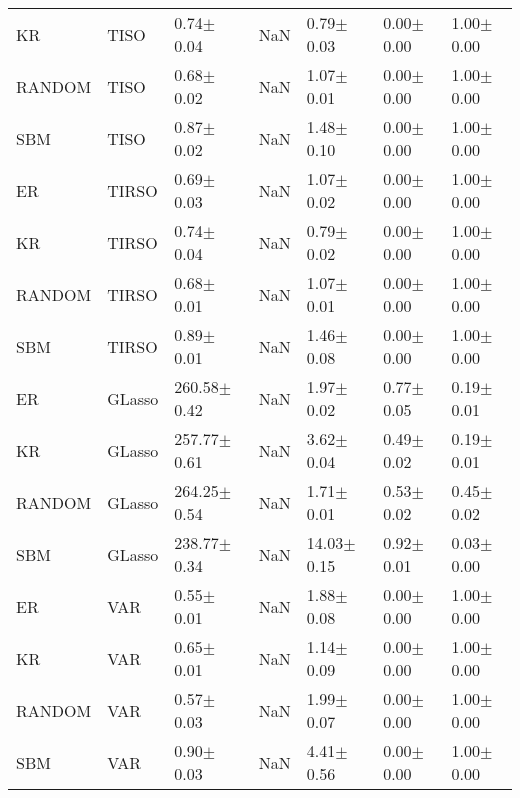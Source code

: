 \begin{tabular}{lllllll}
KR & TISO & 0.74{\scriptsize$\pm$0.04} & NaN & 0.79{\scriptsize$\pm$0.03} & 0.00{\scriptsize$\pm$0.00} & 1.00{\scriptsize$\pm$0.00} \\
RANDOM & TISO & 0.68{\scriptsize$\pm$0.02} & NaN & 1.07{\scriptsize$\pm$0.01} & 0.00{\scriptsize$\pm$0.00} & 1.00{\scriptsize$\pm$0.00} \\
SBM & TISO & 0.87{\scriptsize$\pm$0.02} & NaN & 1.48{\scriptsize$\pm$0.10} & 0.00{\scriptsize$\pm$0.00} & 1.00{\scriptsize$\pm$0.00} \\
ER & TIRSO & 0.69{\scriptsize$\pm$0.03} & NaN & 1.07{\scriptsize$\pm$0.02} & 0.00{\scriptsize$\pm$0.00} & 1.00{\scriptsize$\pm$0.00} \\
KR & TIRSO & 0.74{\scriptsize$\pm$0.04} & NaN & 0.79{\scriptsize$\pm$0.02} & 0.00{\scriptsize$\pm$0.00} & 1.00{\scriptsize$\pm$0.00} \\
RANDOM & TIRSO & 0.68{\scriptsize$\pm$0.01} & NaN & 1.07{\scriptsize$\pm$0.01} & 0.00{\scriptsize$\pm$0.00} & 1.00{\scriptsize$\pm$0.00} \\
SBM & TIRSO & 0.89{\scriptsize$\pm$0.01} & NaN & 1.46{\scriptsize$\pm$0.08} & 0.00{\scriptsize$\pm$0.00} & 1.00{\scriptsize$\pm$0.00} \\
ER & GLasso & 260.58{\scriptsize$\pm$0.42} & NaN & 1.97{\scriptsize$\pm$0.02} & 0.77{\scriptsize$\pm$0.05} & 0.19{\scriptsize$\pm$0.01} \\
KR & GLasso & 257.77{\scriptsize$\pm$0.61} & NaN & 3.62{\scriptsize$\pm$0.04} & 0.49{\scriptsize$\pm$0.02} & 0.19{\scriptsize$\pm$0.01} \\
RANDOM & GLasso & 264.25{\scriptsize$\pm$0.54} & NaN & 1.71{\scriptsize$\pm$0.01} & 0.53{\scriptsize$\pm$0.02} & 0.45{\scriptsize$\pm$0.02} \\
SBM & GLasso & 238.77{\scriptsize$\pm$0.34} & NaN & 14.03{\scriptsize$\pm$0.15} & 0.92{\scriptsize$\pm$0.01} & 0.03{\scriptsize$\pm$0.00} \\
ER & VAR & 0.55{\scriptsize$\pm$0.01} & NaN & 1.88{\scriptsize$\pm$0.08} & 0.00{\scriptsize$\pm$0.00} & 1.00{\scriptsize$\pm$0.00} \\
KR & VAR & 0.65{\scriptsize$\pm$0.01} & NaN & 1.14{\scriptsize$\pm$0.09} & 0.00{\scriptsize$\pm$0.00} & 1.00{\scriptsize$\pm$0.00} \\
RANDOM & VAR & 0.57{\scriptsize$\pm$0.03} & NaN & 1.99{\scriptsize$\pm$0.07} & 0.00{\scriptsize$\pm$0.00} & 1.00{\scriptsize$\pm$0.00} \\
SBM & VAR & 0.90{\scriptsize$\pm$0.03} & NaN & 4.41{\scriptsize$\pm$0.56} & 0.00{\scriptsize$\pm$0.00} & 1.00{\scriptsize$\pm$0.00} \\

\end{tabular}
